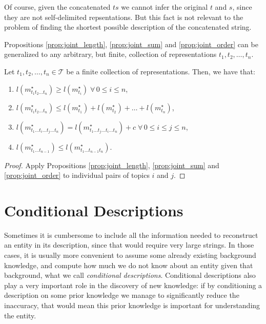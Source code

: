 Of course, given the concatenated $ts$ we cannot infer the original $t$ and $s$, since they are not self-delimited repsentations. But this fact is not relevant to the problem of finding the shortest possible description of the concatenated string.

Propositions \ref{prop:joint_length}, \ref{prop:joint_sum} and \ref{prop:joint_order} can be generalized to any arbitrary, but finite, collection of representations $t_1, t_2, \ldots, t_n$.

\begin{proposition}
\label{prop:joint_multiple_topics}
Let $t_1, t_2, \ldots, t_n \in \mathcal{T}$ be a finite collection of representations. Then, we have that:

\renewcommand{\theenumi}{\roman{enumi}}
\begin{enumerate}
\item $l(m_{t_1 t_2 \ldots t_n}^\star) \geq l(m_ {t_i}^\star) \; \forall \, 0 \leq i \leq n$,
\item $l(m_{t_1 t_2 \ldots t_n}^\star) \leq l(m_ {t_1}^\star) + l(m_ {t_2}^\star) + \ldots + l(m_ {t_n}^\star)$,
\item $l(m_{t_1 \ldots t_i \ldots t_j \ldots t_n}^\star) = l(m_{t_1 \ldots t_j \ldots t_i \ldots t_n}^\star) + c \; \forall \, 0 \leq i \leq j \leq n$,
\item $l(m_{t_1 \ldots t_{n-1}}^\star) \leq l(m_{t_1 \ldots t_{n-1} t_n}^\star)$.
\end{enumerate}
\end{proposition}
\begin{proof}
Apply Propositions \ref{prop:joint_length}, \ref{prop:joint_sum} and \ref{prop:joint_order} to individual pairs of topics $i$ and $j$.
\end{proof}

%
%

\section{Conditional Descriptions}

Sometimes it is cumbersome to include all the information needed to reconstruct an entity in its description, since that would require very large strings. In those cases, it is usually more convenient to assume some already existing background knowledge, and compute how much we do not know about an entity given that background, what we call \emph{conditional descriptions}. Conditional descriptions also play a very important role in the discovery of new knowledge: if by conditioning a description on some prior knowledge we manage to significantly reduce the inaccuracy, that would mean this prior knowledge is important for understanding the entity.

